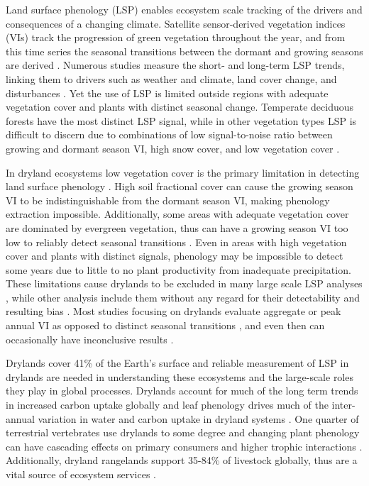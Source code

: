 \documentclass{article}
\begin{document}
Land surface phenology (LSP) enables ecosystem scale tracking of the drivers and consequences of a changing climate. Satellite sensor-derived vegetation indices (VIs) track the progression of green vegetation throughout the year, and from this time series the seasonal transitions between the dormant and growing seasons are derived \cite{zhang-liu2018, friedl2006, jonsson2004, sakamoto2010, gao2017, gray2019, bolton2020, zeng-wardlow2020}. Numerous studies measure the short- and long-term LSP trends, linking them to drivers such as weather and climate, land cover change, and disturbances \cite{piao-wang2020}. Yet the use of LSP is limited outside regions with adequate vegetation cover and plants with distinct seasonal change. Temperate deciduous forests have the most distinct LSP signal, while in other vegetation types LSP is difficult to discern due to combinations of low signal-to-noise ratio between growing and dormant season VI, high snow cover, and low vegetation cover \cite{richardson2018b, white2009}. 

In dryland ecosystems low vegetation cover is the primary limitation in detecting land surface phenology \cite{ma2013}. High soil fractional cover can cause the growing season VI to be indistinguishable from the dormant season VI, making phenology extraction impossible. Additionally, some areas with adequate vegetation cover are dominated by evergreen vegetation, thus can have a growing season VI too low to reliably detect seasonal transitions \cite{walker2015}. Even in areas with high vegetation cover and plants with distinct signals, phenology may be impossible to detect some years due to little to no plant productivity from inadequate precipitation. These limitations cause drylands to be excluded in many large scale LSP analyses \cite{jeong2011, zhu2012, shen-zhang2014, xin-broich2015, garonna2016}, while other analysis include them without any regard for their detectability and resulting bias \cite{buitenwerf2015, VanLeeuwen2010}. Most studies focusing on drylands evaluate aggregate or peak annual VI as opposed to distinct seasonal transitions \cite{walker2015, hou-du2019}, and even then can occasionally have inconclusive results \cite{fensholt2012, andela2013}.

Drylands cover 41\% of the Earth’s surface \cite{hoover2020} and reliable measurement of LSP in drylands are needed in understanding these ecosystems and the large-scale roles they play in global processes. Drylands account for much of the long term trends in increased carbon uptake globally \cite{ahlstrom2015} and leaf phenology drives much of the inter-annual variation in water and carbon uptake in dryland systems \cite{whitley2017, renwick2019}. One quarter of terrestrial vertebrates use drylands to some degree \cite{safriel2005} and changing plant phenology can have cascading effects on primary consumers and higher trophic interactions \cite{aiken2017}. Additionally, dryland rangelands support 35-84\% of livestock globally, thus are a vital source of ecosystem services \cite{chapin1996}.
\end{document}
